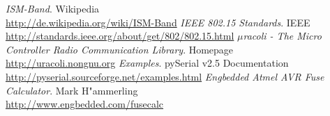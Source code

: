 \documentclass{clt2011}
\begin{document}

\begin{thebibliography}{XX}
    \emph{ISM-Band}. Wikipedia\\
    \url{http://de.wikipedia.org/wiki/ISM-Band}
    \emph{IEEE 802.15 Standards}. IEEE\\
    \url{http://standards.ieee.org/about/get/802/802.15.html}
    \emph{$\mu{}$racoli - The Micro Controller Radio Communication Library}. Homepage\\
    \url{http://uracoli.nongnu.org}
    \emph{Examples}. pySerial v2.5 Documentation\\
    \url{http://pyserial.sourceforge.net/examples.html}
    \emph{Engbedded Atmel AVR Fuse Calculator}. Mark H"ammerling\\
    \url{http://www.engbedded.com/fusecalc}
\end{thebibliography}
\end{document}
